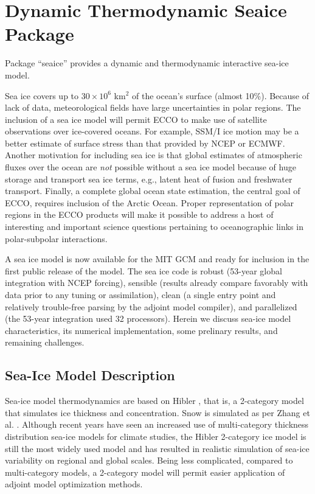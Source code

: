 
\chapter{Dynamic Thermodynamic Seaice Package}
  
Package ``seaice'' provides a dynamic and thermodynamic interactive sea-ice
model.


Sea ice covers up to $30\times 10^6$ km$^2$ of the ocean's surface
(almost 10\%).  Because of lack of data, meteorological fields have
large uncertainties in polar regions.  The inclusion of a sea ice
model will permit ECCO to make use of satellite observations over
ice-covered oceans.  For example, SSM/I ice motion may be a better
estimate of surface stress than that provided by NCEP or ECMWF.
Another motivation for including sea ice is that global estimates of
atmospheric fluxes over the ocean are {\em not} possible without a sea
ice model because of huge storage and transport sea ice terms, e.g.,
latent heat of fusion and freshwater transport.  Finally, a complete
global ocean state estimation, the central goal of ECCO, requires
inclusion of the Arctic Ocean.  Proper representation of polar regions
in the ECCO products will make it possible to address a host of
interesting and important science questions pertaining to
oceanographic links in polar-subpolar interactions.

A sea ice model is now available for the MIT GCM and ready for
inclusion in the first public release of the model.  The sea ice code
is robust (53-year global integration with NCEP forcing), sensible
(results already compare favorably with data prior to any tuning or
assimilation), clean (a single entry point and relatively trouble-free
parsing by the adjoint model compiler), and parallelized (the 53-year
integration used 32 processors).  Herein we discuss sea-ice model
characteristics, its numerical implementation, some prelinary
results, and remaining challenges.

\section{Sea-Ice Model Description}

Sea-ice model thermodynamics are based on Hibler \cite{hib80}, that is, a
2-category model that simulates ice thickness and concentration.  Snow is
simulated as per Zhang et al. \cite{zha98a}.  Although recent years have seen
an increased use of multi-category thickness distribution sea-ice models for
climate studies, the Hibler 2-category ice model is still the most widely used
model and has resulted in realistic simulation of sea-ice variability on
regional and global scales.  Being less complicated, compared to
multi-category models, a 2-category model will permit easier application of
adjoint model optimization methods.

